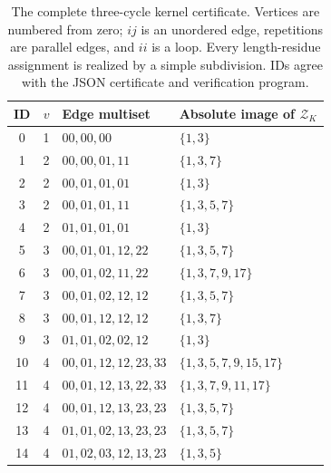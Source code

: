 \begin{table}[htbp]
\centering\small
\begin{tabular}{crll}
\toprule
ID & $v$ & Edge multiset & Absolute image of $\mathcal Z_K$\\
\midrule
0 & 1 & $00,00,00$ & $\{1,3\}$\\
1 & 2 & $00,00,01,11$ & $\{1,3,7\}$\\
2 & 2 & $00,01,01,01$ & $\{1,3\}$\\
3 & 2 & $00,01,01,11$ & $\{1,3,5,7\}$\\
4 & 2 & $01,01,01,01$ & $\{1,3\}$\\
5 & 3 & $00,01,01,12,22$ & $\{1,3,5,7\}$\\
6 & 3 & $00,01,02,11,22$ & $\{1,3,7,9,17\}$\\
7 & 3 & $00,01,02,12,12$ & $\{1,3,5,7\}$\\
8 & 3 & $00,01,12,12,12$ & $\{1,3,7\}$\\
9 & 3 & $01,01,02,02,12$ & $\{1,3\}$\\
10 & 4 & $00,01,12,12,23,33$ & $\{1,3,5,7,9,15,17\}$\\
11 & 4 & $00,01,12,13,22,33$ & $\{1,3,7,9,11,17\}$\\
12 & 4 & $00,01,12,13,23,23$ & $\{1,3,5,7\}$\\
13 & 4 & $01,01,02,13,23,23$ & $\{1,3,5,7\}$\\
14 & 4 & $01,02,03,12,13,23$ & $\{1,3,5\}$\\
\bottomrule
\end{tabular}
\caption{The complete three-cycle kernel certificate. Vertices are numbered
from zero; $ij$ is an unordered edge, repetitions are parallel edges, and
$ii$ is a loop. Every length-residue assignment is realized by a simple
subdivision. IDs agree with the JSON certificate and verification program.}
\label{tab:kernels}
\end{table}
